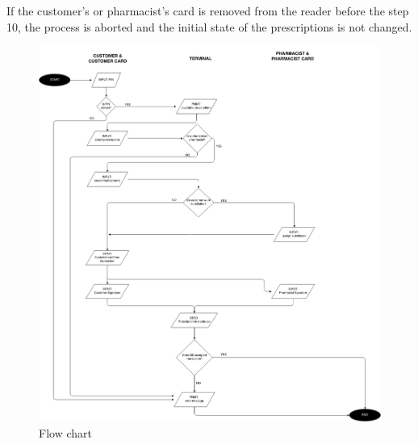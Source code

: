  If the customer's or pharmacist's card is removed from the reader before the step 10, the process is aborted and the initial state of the prescriptions is not changed.

\begin{figure}
    \centering
    \hspace*{-1.2in}
    \includegraphics[width=0.98\textheight]{flow-chart.png}
    \caption{Flow chart}
    \label{fig:flowchart}
\end{figure} 

